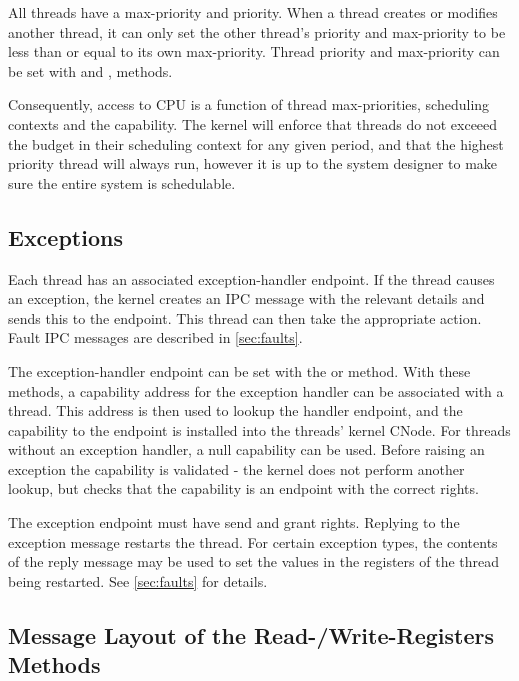 All threads have a max-priority and priority.
When a thread creates or modifies another thread, it can only set the
other thread's priority and max-priority to be less than or equal to its own max-priority. Thread priority and max-priority can be
set with  and
,  methods.

Consequently, access to CPU is a function of thread max-priorities, scheduling contexts and the  capability.
The kernel will enforce that threads do not exceeed the budget in their scheduling context for any given period, and that the highest priority thread will always run, however it is up to the system designer to make sure the entire system is schedulable.

\subsection{Exceptions}

Each thread has an associated exception-handler endpoint. If the thread
causes an exception, the kernel creates an IPC message with the relevant
details and sends this to the endpoint. This
thread can then take the appropriate action. Fault IPC messages are
described in \autoref{sec:faults}.

The exception-handler
endpoint can be set with the  or
 method.
With these methods, a capability address for the exception handler can be associated with a thread.
This address is then used to lookup the handler endpoint, and the capability to the endpoint is installed into the threads' kernel CNode.
For threads without an exception handler, a null capability can be used.
Before raising an exception the capability is validated - the kernel does not perform another lookup, but checks that the capability is an endpoint with the correct rights.

The exception endpoint must have send and grant rights. Replying to the
exception message restarts the thread. For certain exception types, the contents of
the reply message may be used to set the values in the registers of the
thread being restarted.
See \autoref{sec:faults} for details.



\subsection{Message Layout of the Read-/Write-Registers Methods}
\label{sec:read_write_registers}

